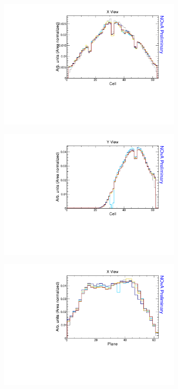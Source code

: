 \begin{figure}[ht!]
\begin{subfigure}{0.5\textwidth}
  \end{subfigure}
  \begin{subfigure}{0.5\textwidth}
    \includegraphics[width=\linewidth]{essentialsec_tb/nhits_cell_x.pdf}
  \end{subfigure}
  \begin{subfigure}{0.5\textwidth}
    \includegraphics[width=\linewidth]{essentialsec_tb/nhits_cell_y.pdf}
  \end{subfigure}
  \begin{subfigure}{0.5\textwidth}
    \includegraphics[width=\linewidth]{essentialsec_tb/nhits_plane_x.pdf}

\end{subfigure}
\end{figure}
